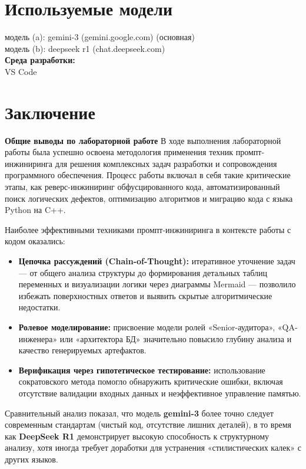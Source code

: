 \documentclass[oneside,a4paper,14pt]{extarticle} %
\begin{document}
	\section*{Используемые модели}
	\noindent
	\indent модель (a): gemini-3 (gemini.google.com) (основная)\\
	\indent модель (b): deepseek r1 (chat.deepseek.com)\\
	\noindent
	\newline
	\textbf{Среда разработки:} \\ 
	\indent VS Code
	
	\setcounter{section}{1}
	
	
	
	
	
	
	
	\newpage
	\section*{Заключение}
	\textbf{Общие выводы по лабораторной работе}
	\newline
	В ходе выполнения лабораторной работы была успешно освоена методология применения техник промпт-инжиниринга для решения комплексных задач разработки и сопровождения программного обеспечения. Процесс работы включал в себя такие критические этапы, как реверс-инжиниринг обфусцированного кода, автоматизированный поиск логических дефектов, оптимизацию алгоритмов и миграцию кода с языка Python на C++.
	
	Наиболее эффективными техниками промпт-инжиниринга в контексте работы с кодом оказались:
	\begin{itemize}
		\item \textbf{Цепочка рассуждений (Chain-of-Thought):} итеративное уточнение задач — от общего анализа структуры до формирования детальных таблиц переменных и визуализации логики через диаграммы Mermaid — позволило избежать поверхностных ответов и выявить скрытые алгоритмические недостатки.
		\item \textbf{Ролевое моделирование:} присвоение модели ролей «Senior-аудитора», «QA-инженера» или «архитектора БД» значительно повысило глубину анализа и качество генерируемых артефактов.
		\item \textbf{Верификация через гипотетическое тестирование:} использование сократовского метода помогло обнаружить критические ошибки, включая отсутствие валидации входных данных и неэффективное управление памятью.
	\end{itemize}
	Сравнительный анализ показал, что модель \textbf{gemini-3} более точно следует современным стандартам (чистый код, отсутствие лишних деталей), в то время как \textbf{DeepSeek R1} демонстрирует высокую способность к структурному анализу, хотя иногда требует доработки для устранения «стилистических калек» с других языков.
	
\end{document}

